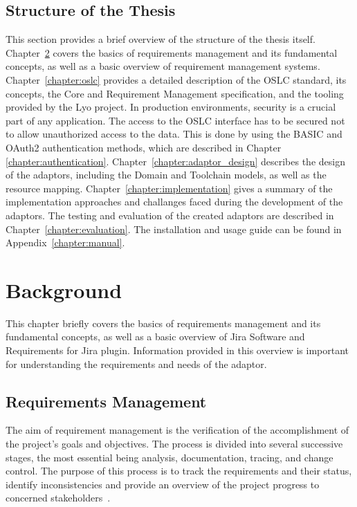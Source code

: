 \section{Structure of the Thesis}
This section provides a brief overview of the structure of the thesis itself. Chapter \ref{chapter:background} covers the basics of requirements management and its fundamental concepts, as well as a basic overview of requirement management systems. Chapter \ref{chapter:oslc} provides a detailed description of the OSLC standard, its concepts, the Core and Requirement Management specification, and the tooling provided by the Lyo project. In production environments, security is a crucial part of any application. The access to the OSLC interface has to be secured not to allow unauthorized access to the data. This is done by using the BASIC and OAuth2 authentication methods, which are described in Chapter \ref{chapter:authentication}. Chapter \ref{chapter:adaptor_design} describes the design of the adaptors, including the Domain and Toolchain models, as well as the resource mapping. Chapter \ref{chapter:implementation} gives a summary of the implementation approaches and challanges faced during the development of the adaptors. The testing and evaluation of the created adaptors are described in Chapter \ref{chapter:evaluation}. The installation and usage guide can be found in Appendix \ref{chapter:manual}.


\chapter{Background}
\label{chapter:background}
This chapter briefly covers the basics of requirements management and its fundamental concepts, as well as a basic overview of Jira Software and Requirements for Jira plugin. Information provided in this overview is important for understanding the requirements and needs of the adaptor.

\section{Requirements Management}
The aim of requirement management is the verification of the accomplishment of the project's goals and objectives. The process is divided into several successive stages, the most essential being analysis, documentation, tracing, and change control. The purpose of this process is to track the requirements and their status, identify inconsistencies and provide an overview of the project progress to concerned stakeholders \cite{requirements_management}.

